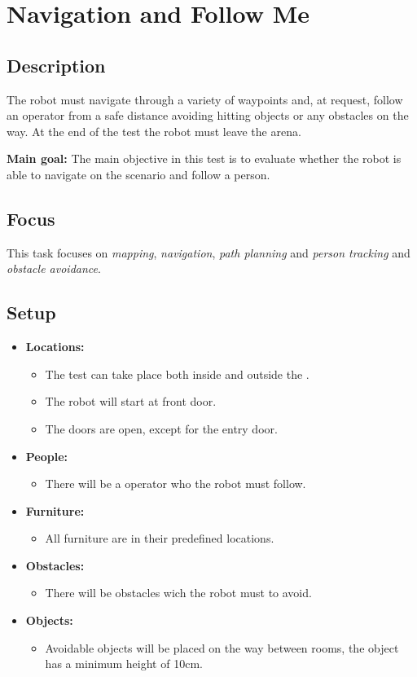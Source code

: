 \section{Navigation and Follow Me}
\label{test:navigation-and-follow-me}

\subsection*{Description}
The robot must navigate through a variety of waypoints and, at request, follow an operator from a safe distance avoiding hitting objects or any obstacles on the way. At the end of the test the robot must leave the arena.

\noindent \textbf{Main goal:}
The main objective in this test is to evaluate whether the robot is able to navigate on the scenario and follow a person.



\subsection*{Focus}
This task focuses on \textit{mapping}, \textit{navigation}, \textit{path planning} and \textit{person tracking} and \textit{obstacle avoidance}.

\subsection*{Setup}
\begin{itemize}[nosep]	
	\item \textbf{Locations:} 
	\begin{itemize}
		\item The test can take place both inside and outside the \Arena{}.
		\item The robot will start at front door.
		\item The doors are open, except for the entry door.
	\end{itemize}	 
	\item \textbf{People:} 
	\begin{itemize}
		\item There will be a operator who the robot must follow.
	\end{itemize}
	\item \textbf{Furniture:} 
	\begin{itemize}
		\item All furniture are in their predefined locations.
	\end{itemize}
	\item \textbf{Obstacles:} 
	\begin{itemize}
		\item There will be obstacles wich the robot must to avoid.
	\end{itemize}
    \item \textbf{Objects:} 
    \begin{itemize}
		\item Avoidable objects will be placed on the way between rooms, the object has a minimum height of 10cm.
	\end{itemize}
\end{itemize}

